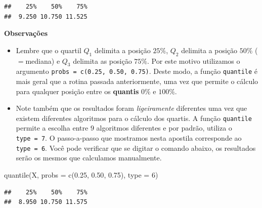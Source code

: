 \documentclass[
]{book}
\newenvironment{Shaded}{\begin{snugshade}}{\end{snugshade}}
\newcommand{\AttributeTok}[1]{\textcolor[rgb]{0.77,0.63,0.00}{#1}}
\newcommand{\DecValTok}[1]{\textcolor[rgb]{0.00,0.00,0.81}{#1}}
\newcommand{\FloatTok}[1]{\textcolor[rgb]{0.00,0.00,0.81}{#1}}
\newcommand{\FunctionTok}[1]{\textcolor[rgb]{0.00,0.00,0.00}{#1}}
\newcommand{\NormalTok}[1]{#1}
\begin{document}
\begin{verbatim}
##    25%    50%    75% 
##  9.250 10.750 11.525
\end{verbatim}

\textbf{Observações}

\begin{itemize}
\item
  Lembre que o quartil \(Q_1\) delimita a posição \(25\%\), \(Q_2\) delimita a posição \(50\%\) (\(=\)mediana) e \(Q_3\) delimita as posição \(75\%\). Por este motivo utilizamos o argumento \texttt{probs\ =\ c(0.25,\ 0.50,\ 0.75)}. Deste modo, a função \texttt{quantile} é mais geral que a rotina passada anteriormente, uma vez que permite o cálculo para qualquer posição entre os \textbf{quantis} \(0\%\) e \(100\%\).
\item
  Note também que os resultados foram \emph{ligeiramente} diferentes uma vez que existem diferentes algoritmos para o cálculo dos quartis. A função \texttt{quantile} permite a escolha entre \(9\) algoritmos diferentes e por padrão, utiliza o \texttt{type\ =\ 7}. O passo-a-passo que mostramos nesta apostila corresponde ao \texttt{type\ =\ 6}. Você pode verificar que se digitar o comando abaixo, os resultados serão os mesmos que calculamos manualmente.
\end{itemize}

\begin{Shaded}
\begin{Highlighting}[]
\FunctionTok{quantile}\NormalTok{(X, }\AttributeTok{probs =} \FunctionTok{c}\NormalTok{(}\FloatTok{0.25}\NormalTok{, }\FloatTok{0.50}\NormalTok{, }\FloatTok{0.75}\NormalTok{), }\AttributeTok{type =} \DecValTok{6}\NormalTok{)}
\end{Highlighting}
\end{Shaded}

\begin{verbatim}
##    25%    50%    75% 
##  8.950 10.750 11.575
\end{verbatim}
\end{document}
